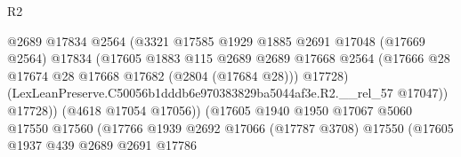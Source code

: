 \begin{lexlean}{R2}
\begin{coremodule}
                                            @2689
                                            @17834
                                            @2564
                                            (@3321
                                              @17585
                                              @1929
                                              @1885
                                              @2691
                                              @17048
                                              (@17669 @2564)
                                              @17834
                                              (@17605
                                                @1883
                                                @115
                                                @2689
                                                @2689
                                                @17668
                                                @2564
                                                (@17666
                                                  @28
                                                  @17674
                                                  @28
                                                  @17668
                                                  @17682
                                                  (@2804 (@17684 @28)))
                                                @17728)
                                              (LexLeanPreserve.C50056b1dddb6e970383829ba5044af3e.R2.__rel_57
                                                @17047))
                                            @17728))
                                        (@4618 @17054 @17056))
                                      (@17605
                                        @1940
                                        @1950
                                        @17067
                                        @5060
                                        @17550
                                        @17560
                                        (@17766
                                          @1939
                                          @2692
                                          @17066
                                          (@17787 @3708)
                                          @17550
                                          (@17605
                                            @1937
                                            @439
                                            @2689
                                            @2691
                                            @17786

\end{coremodule}
\end{lexlean}
